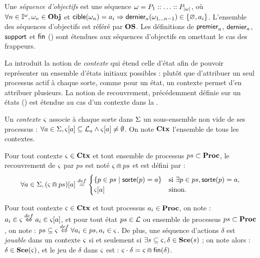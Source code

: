 \begin{definition}
  Une \emph{séquence d'objectifs} est une séquence $\omega = P_1 :: \ldots :: P_{|\omega|}$,
  où $\forall n \in \mathbb{I}^{\omega}, \omega_n \in \mathbf{Obj}$
  et $\mathsf{cible}(\omega_n) = a_i \Rightarrow \mathsf{dernier}_{a}(\omega_{1 \ldots n-1}) \in \{ \varnothing, a_i \}$.
  L'ensemble des séquences d'objectifs est référé par $\mathbf{OS}$.
  Les définitions de $\mathsf{premier}_a$, $\mathsf{dernier}_a$,  $\mathsf{support}$ et $\mathsf{fin}$
  () sont étendues aux séquences d'objectifs en omettant le cas des frappeurs.
\end{definition}

La  introduit la notion de \emph{contexte} qui étend celle d'état
afin de pouvoir représenter un ensemble d'états initiaux possibles :
plutôt que d'attribuer un seul processus actif à chaque sorte, comme pour un état,
un contexte permet d'en attribuer plusieurs.
La notion de recouvrement, précédemment définie sur un états ()
est étendue au cas d'un contexte dans la .

\begin{definition}
  Un \emph{contexte} $\varsigma$ associe à chaque sorte dans $\Sigma$ un sous-ensemble non vide
  de ses processus :
  $\forall a \in \Sigma, {\varsigma[a]} \subseteq \mathcal{L}_a \wedge {\varsigma[a]} \neq \emptyset$.
  On note $\mathbf{Ctx}$ l'ensemble de tous les contextes.
\end{definition}

\begin{definition}
  Pour tout contexte $\varsigma \in \mathbf{Ctx}$ et tout ensemble de processus $ps \subset \mathbf{Proc}$,
  le recouvrement de $\varsigma$ par $ps$ est noté $\varsigma \Cap ps$ et est défini par :
    \[ \forall a \in \Sigma, {(\varsigma \Cap ps)[a]} \stackrel{def}=
      \begin{cases}
        \{ p \in ps \mid \mathsf{sorte}(p)=a \} & \text{si } \exists p \in ps, \mathsf{sorte}(p)=a,\\
        {\varsigma[a]} & \text{sinon.}
      \end{cases} \]
\end{definition}

Pour tout contexte $\varsigma \in \mathbf{Ctx}$ et tout processus $a_i \in \mathbf{Proc}$, on note :
$a_i \in \varsigma \stackrel{def}\Leftrightarrow a_i \in {\varsigma[a]}$,
et pour tout état $ps \in \mathcal{L}$ ou ensemble de processus $ps \subset \mathbf{Proc}$, on note :
$ps \subseteq \varsigma \stackrel{def}\Leftrightarrow \forall a_i \in ps, a_i \in \varsigma$.
De plus, une séquence d'actions $\delta$ est \emph{jouable} dans un contexte $\varsigma$
si et seulement si $\exists s \subseteq \varsigma, \delta \in \mathbf{Sce}(s)$ ;
on note alors : $\delta \in \mathbf{Sce}(\varsigma)$,
et le jeu de $\delta$ dans $\varsigma$ est : $\varsigma \cdot \delta = \varsigma \Cap \mathsf{fin}(\delta)$.

